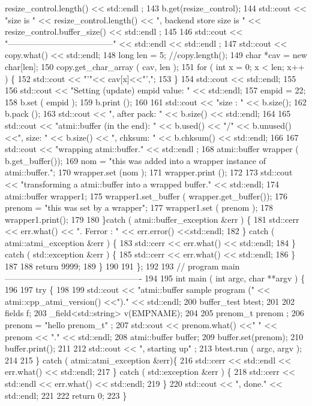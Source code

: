 \begin{DoxyCodeInclude}
       resize\_control.length() << std::endl ;
143         b.get(resize\_control);
144         std::cout << "size is " << resize\_control.length() << ", backend store size is " <<
       resize\_control.buffer\_size() << std::endl ;
145 
146         std::cout << "--------------------------------------" << std::endl << std::endl ;
147         std::cout << copy.what() << std::endl;
148         long len = 5;                  //copy.length();
149         char *cav = new char[len];
150         copy.get\_char\_array ( cav, len );
151         for ( int x = 0; x < len; x++ ) \{
152           std::cout << "'"<< cav[x]<<"',";
153         \}
154         std::cout << std::endl;
155 
156         std::cout << "Setting (update) empid value: " << std::endl;
157         empid = 22;
158         b.set ( empid );
159         b.print ();
160 
161         std::cout << "size : " << b.size();
162         b.pack ();
163         std::cout << ", after pack: " << b.size() << std::endl;
164 
165         std::cout << "atmi::buffer (in the end): " << b.used() << "/" << b.unused() <<", size: " <<
       b.size() << ", chksum: " << b.chksum() <<  std::endl;
166 
167         std::cout << "wrapping atmi::buffer." << std::endl ;
168         atmi::buffer wrapper ( b.get\_buffer());
169         nom = "this was added into a wrapper instance of atmi::buffer.";
170         wrapper.set (nom );
171         wrapper.print ();
172 
173         std::cout << "transforming a atmi::buffer into a wrapped buffer." << std::endl;
174         atmi::buffer wrapper1;
175         wrapper1.set\_buffer ( wrapper.get\_buffer());
176         prenom = "this was set by a wrapper";
177         wrapper1.set ( prenom );
178         wrapper1.print();
179 
180       \}catch ( atmi::buffer\_exception &err ) \{
181         std::cerr << err.what() << ". Ferror : " << err.error() <<std::endl;
182       \} catch ( atmi::atmi\_exception &err ) \{
183         std::cerr << err.what() << std::endl;
184       \} catch ( std::exception &err ) \{
185         std::cerr << err.what() << std::endl;
186       \}
187 
188       return 9999;
189     \}
190 
191 \};
192 
193 // program main -------------------------------------------------
194 
195 int main ( int argc, char **argv ) \{
196 
197   try \{
198 
199     std::cout << "atmi::buffer sample program (" << atmi::cpp\_atmi\_version() <<")." << std::endl;
200     buffer\_test btest;
201 
202     fields f;
203     \_field<std::string> v(EMPNAME);
204 
205     prenom\_t prenom ;
206     prenom = "hello prenom\_t" ;
207     std::cout << prenom.what() <<" " << prenom << "." << std::endl;
208     atmi::buffer buffer;
209     buffer.set(prenom);
210     buffer.print();
211 
212     std::cout << ", starting up" ;
213     btest.run ( argc, argv );
214 
215   \} catch ( atmi::atmi\_exception &err)\{
216     std::cerr << std::endl << err.what() << std::endl;
217   \} catch ( std::exception &err ) \{
218     std::cerr << std::endl << err.what() << std::endl;
219   \}
220   std::cout << ", done." << std::endl;
221 
222   return 0;
223 \}
\end{DoxyCodeInclude}
 